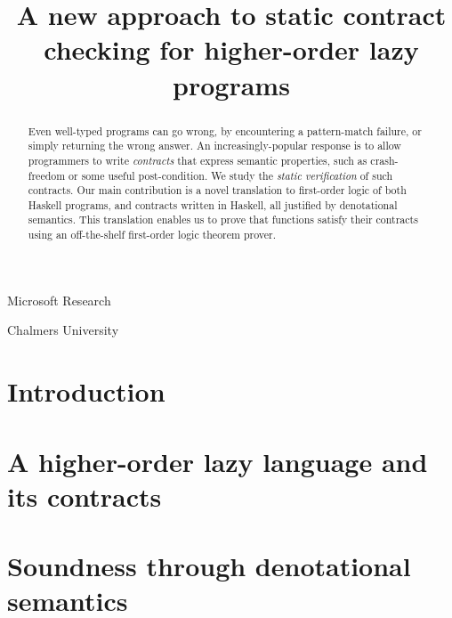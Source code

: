 \documentclass[preprint,nocopyrightspace]{sigplanconf}
\begin{document}
\renewcommand{\Th}{{\cal T}}

\newcommand{\theLang}{\lambda_{\sf HALO}}

\title{A new approach to static contract checking for higher-order lazy programs}

           {Microsoft Research}{}

           {Chalmers University}{}
\maketitle
\makeatactive

\begin{abstract}
Even well-typed programs can go wrong, by encountering a pattern-match
failure, or simply returning the wrong answer.  An
increasingly-popular response is to allow programmers to write
\emph{contracts} that express semantic properties, such as
crash-freedom or some useful post-condition.
We study the \emph{static verification} of such contracts.
Our main contribution is a novel translation to first-order logic
of both Haskell programs, and contracts written in Haskell,
all justified by denotational semantics. This translation enables us to prove
that functions satisfy their contracts using an off-the-shelf first-order logic
theorem prover.
\end{abstract}

\section{Introduction}\label{s:intro}
  


\section{A higher-order lazy language and its contracts}\label{sect:language}
  

\section{Soundness through denotational semantics}
   \label{sect:contracts}\label{ssect:denot}
  
\end{document}
